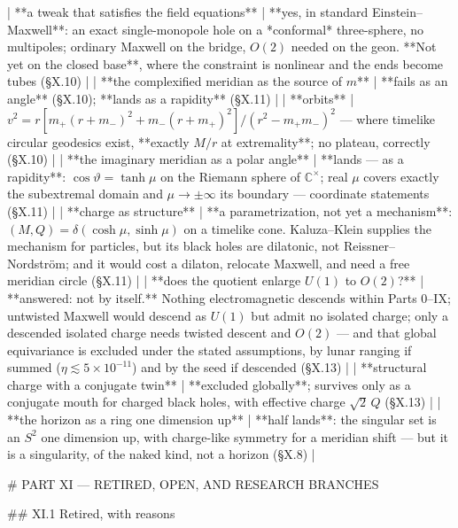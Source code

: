| **a tweak that satisfies the field equations** | **yes, in standard Einstein–Maxwell**: an exact single-monopole hole on a *conformal* three-sphere, no multipoles; ordinary Maxwell on the bridge, $O(2)$ needed on the geon. **Not yet on the closed base**, where the constraint is nonlinear and the ends become tubes (§X.10) |
| **the complexified meridian as the source of $m$** | **fails as an angle** (§X.10); **lands as a rapidity** (§X.11) |
| **orbits** | $v^2 = r[m_+(r+m_-)^2+m_-(r+m_+)^2]/(r^2-m_+m_-)^2$ — where timelike circular geodesics exist, **exactly $M/r$ at extremality**; no plateau, correctly (§X.10) |
| **the imaginary meridian as a polar angle** | **lands — as a rapidity**: $\cos\vartheta = \tanh\mu$ on the Riemann sphere of $\mathbb{C}^\times$; real $\mu$ covers exactly the subextremal domain and $\mu\to\pm\infty$ its boundary — coordinate statements (§X.11) |
| **charge as structure** | **a parametrization, not yet a mechanism**: $(M,Q) = \delta(\cosh\mu,\sinh\mu)$ on a timelike cone. Kaluza–Klein supplies the mechanism for particles, but its black holes are dilatonic, not Reissner–Nordström; and it would cost a dilaton, relocate Maxwell, and need a free meridian circle (§X.11) |
| **does the quotient enlarge $U(1)$ to $O(2)$?** | **answered: not by itself.** Nothing electromagnetic descends within Parts 0–IX; untwisted Maxwell would descend as $U(1)$ but admit no isolated charge; only a descended isolated charge needs twisted descent and $O(2)$ — and that global equivariance is excluded under the stated assumptions, by lunar ranging if summed ($\eta\lesssim5\times10^{-11}$) and by the seed if descended (§X.13) |
| **structural charge with a conjugate twin** | **excluded globally**; survives only as a conjugate mouth for charged black holes, with effective charge $\sqrt2\,Q$ (§X.13) |
| **the horizon as a ring one dimension up** | **half lands**: the singular set is an $S^2$ one dimension up, with charge-like symmetry for a meridian shift — but it is a singularity, of the naked kind, not a horizon (§X.8) |

# PART XI — RETIRED, OPEN, AND RESEARCH BRANCHES

## XI.1 Retired, with reasons

